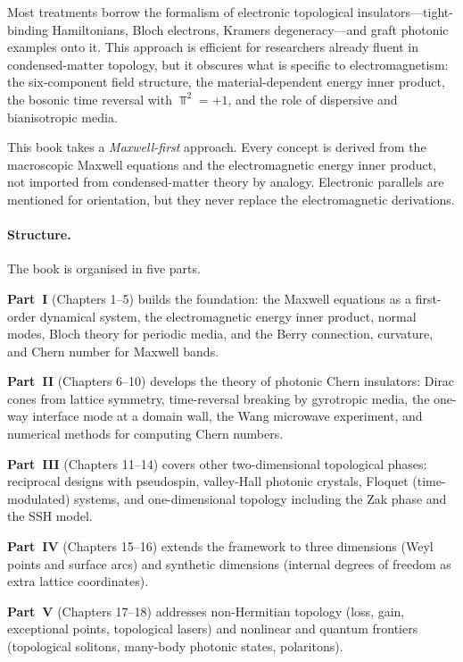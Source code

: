 Most treatments borrow the formalism of electronic topological
insulators---tight-binding Hamiltonians, Bloch electrons, Kramers
degeneracy---and graft photonic examples onto it.  This approach is
efficient for researchers already fluent in condensed-matter topology,
but it obscures what is specific to electromagnetism: the six-component
field structure, the material-dependent energy inner product, the
bosonic time reversal with $\Top^2=+1$, and the role of dispersive and
bianisotropic media.

This book takes a \emph{Maxwell-first} approach.  Every concept is
derived from the macroscopic Maxwell equations and the electromagnetic
energy inner product, not imported from condensed-matter theory by
analogy.  Electronic parallels are mentioned for orientation, but they
never replace the electromagnetic derivations.

\paragraph{Structure.}

The book is organised in five parts.

\textbf{Part~I} (Chapters 1--5) builds the foundation: the Maxwell
equations as a first-order dynamical system, the electromagnetic energy
inner product, normal modes, Bloch theory for periodic media, and the
Berry connection, curvature, and Chern number for Maxwell bands.

\textbf{Part~II} (Chapters 6--10) develops the theory of photonic Chern
insulators: Dirac cones from lattice symmetry, time-reversal breaking
by gyrotropic media, the one-way interface mode at a domain wall,
the Wang microwave experiment, and numerical methods for computing
Chern numbers.

\textbf{Part~III} (Chapters 11--14) covers other two-dimensional
topological phases: reciprocal designs with pseudospin, valley-Hall
photonic crystals, Floquet (time-modulated) systems, and
one-dimensional topology including the Zak phase and the SSH model.

\textbf{Part~IV} (Chapters 15--16) extends the framework to three
dimensions (Weyl points and surface arcs) and synthetic dimensions
(internal degrees of freedom as extra lattice coordinates).

\textbf{Part~V} (Chapters 17--18) addresses non-Hermitian topology
(loss, gain, exceptional points, topological lasers) and nonlinear
and quantum frontiers (topological solitons, many-body photonic
states, polaritons).


